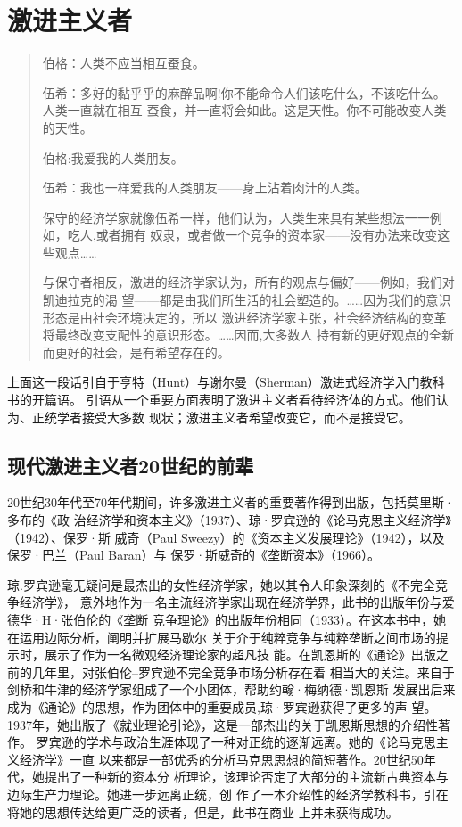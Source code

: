 \section{激进主义者}

\begin{quotation}
伯格：人类不应当相互蚕食。

伍希：多好的黏乎乎的麻醉品啊!你不能命令人们该吃什么，不该吃什么。人类一直就在相互
蚕食，并一直将会如此。这是天性。你不可能改变人类的天性。

伯格:我爱我的人类朋友。

伍希：我也一样爱我的人类朋友——身上沾着肉汁的人类。

\bigskip

保守的经济学家就像伍希一样，他们认为，人类生来具有某些想法一一例如，吃人,或者拥有
奴隶，或者做一个竞争的资本家——没有办法来改变这些观点……

与保守者相反，激进的经济学家认为，所有的观点与偏好——例如，我们对凯迪拉克的渴
望——都是由我们所生活的社会塑造的。……因为我们的意识形态是由社会环境决定的，所以
激进经济学家主张，社会经济结构的变革将最终改变支配性的意识形态。……因而,大多数人
持有新的更好观点的全新而更好的社会，是有希望存在的。
\end{quotation}

上面这一段话引自于亨特（Hunt）与谢尔曼（Sherman）激进式经济学入门教科书的开篇语。
引语从一个重要方面表明了激进主义者看待经济体的方式。他们认为、正统学者接受大多数
现状；激进主义者希望改变它，而不是接受它。


\subsection{现代激进主义者20世纪的前辈}

20世纪30年代至70年代期间，许多激进主义者的重要著作得到出版，包括莫里斯·多布的《政
治经济学和资本主义》（1937）、琼·罗宾逊的《论马克思主义经济学》（1942）、保罗·斯
威奇（Paul Sweezy）的《资本主义发展理论》（1942），以及保罗·巴兰（Paul Baran）与
保罗·斯威奇的《垄断资本》（1966）。

琼.罗宾逊毫无疑问是最杰出的女性经济学家，她以其令人印象深刻的《不完全竞争经济学》，
意外地作为一名主流经济学家出现在经济学界，此书的出版年份与爱德华·H·张伯伦的《垄断
竞争理论》的出版年份相同（1933）。在这本书中，她在运用边际分析，阐明并扩展马歇尔
关于介于纯粹竞争与纯粹垄断之间市场的提示时，展示了作为一名微观经济理论家的超凡技
能。在凯恩斯的《通论》出版之前的几年里，对张伯伦--罗宾逊不完全竞争市场分析存在着
相当大的关注。来自于剑桥和牛津的经济学家组成了一个小团体，帮助约翰·梅纳德·凯恩斯
发展出后来成为《通论》的思想，作为团体中的重要成员,琼·罗宾逊获得了更多的声
望。1937年，她出版了《就业理论引论》，这是一部杰出的关于凯恩斯思想的介绍性著作。
罗宾逊的学术与政治生涯体现了一种对正统的逐渐远离。她的《论马克思主义经济学》一直
以来都是一部优秀的分析马克思思想的简短著作。20世纪50年代，她提出了一种新的资本分
析理论，该理论否定了大部分的主流新古典资本与边际生产力理论。她进一步远离正统，创
作了一本介绍性的经济学教科书，引在将她的思想传达给更广泛的读者，但是，此书在商业
上并未获得成功。

